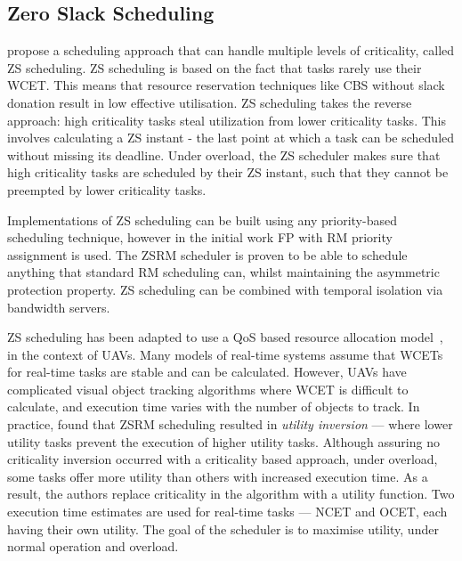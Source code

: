 \subsection{Zero Slack Scheduling}

 propose a scheduling approach that can handle multiple levels of criticality,
called \gls{ZS} scheduling. \gls{ZS} scheduling is based on the fact that tasks rarely use their
\gls{WCET}.  This means that resource reservation techniques like \gls{CBS} without slack donation
result in low effective utilisation.  ZS scheduling takes the reverse approach: high criticality
tasks steal utilization from lower criticality tasks.  This involves calculating a \gls{ZS} instant
- the last point at which a task can be scheduled without missing its deadline.  Under overload, the
\gls{ZS} scheduler makes sure that high criticality tasks are scheduled by their \gls{ZS} instant,
such that they cannot be preempted by lower criticality tasks.

Implementations of \gls{ZS} scheduling can be built using any priority-based scheduling technique,
however in the initial work \gls{FP} with \gls{RM} priority assignment is used.  The
\gls{ZS}\gls{RM} scheduler is proven to be able to schedule anything that standard \gls{RM}
scheduling can, whilst maintaining the asymmetric protection property.  \gls{ZS} scheduling can be
combined with temporal isolation via bandwidth servers.

\gls{ZS} scheduling has been adapted to use a \gls{QoS} based resource allocation
model~\citep{deNiz_WSRR_12}, in the context of \glspl{UAV}.  Many models of real-time systems assume
that \glspl{WCET} for real-time tasks are stable and can be calculated.  However, \glspl{UAV} have
complicated visual object tracking algorithms where \gls{WCET} is difficult to calculate, and
execution time varies with the number of objects to track.  In practice,  found
that \gls{ZS}\gls{RM} scheduling resulted in \emph{utility inversion} --- where lower utility tasks
prevent the execution of higher utility tasks.  Although assuring no criticality inversion occurred
with a criticality based approach, under overload, some tasks offer more utility than others with
increased execution time.  As a result, the authors replace criticality in the algorithm with a
utility function.  Two execution time estimates are used for real-time tasks --- \gls{NCET} and
\gls{OCET}, each having their own utility.  The goal of the scheduler is to maximise utility, under
normal operation and overload.

